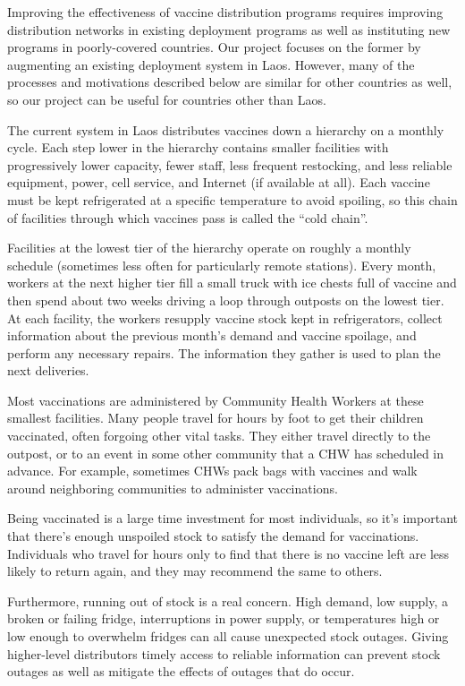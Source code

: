 \documentclass{acm_proc_article-sp}
\begin{document}
Improving the effectiveness of vaccine distribution programs requires improving distribution networks in existing deployment programs as well as instituting new programs in poorly-covered countries. Our project focuses on the former by augmenting an existing deployment system in Laos. However, many of the processes and motivations described below are similar for other countries as well, so our project can be useful for countries other than Laos.

The current system in Laos distributes vaccines down a hierarchy on a monthly cycle. Each step lower in the hierarchy contains smaller facilities with progressively lower capacity, fewer staff, less frequent restocking, and less reliable equipment, power, cell service, and Internet (if available at all). Each vaccine must be kept refrigerated at a specific temperature to avoid spoiling, so this chain of facilities through which vaccines pass is called the ``cold chain''.

Facilities at the lowest tier of the hierarchy operate on roughly a monthly schedule (sometimes less often for particularly remote stations). Every month, workers at the next higher tier fill a small truck with ice chests full of vaccine and then spend about two weeks driving a loop through outposts on the lowest tier. At each facility, the workers resupply vaccine stock kept in refrigerators, collect information about the previous month's demand and vaccine spoilage, and perform any necessary repairs. The information they gather is used to plan the next deliveries. 

Most vaccinations are administered by Community Health Workers at these smallest facilities. Many people travel for hours by foot to get their children vaccinated, often forgoing other vital tasks. They either travel directly to the outpost, or to an event in some other community that a CHW has scheduled in advance. For example, sometimes CHWs pack bags with vaccines and walk around neighboring communities to administer vaccinations.

Being vaccinated is a large time investment for most individuals, so it's important that there's enough unspoiled stock to satisfy the demand for vaccinations. Individuals who travel for hours only to find that there is no vaccine left are less likely to return again, and they may recommend the same to others. 

Furthermore, running out of stock is a real concern. High demand, low supply, a broken or failing fridge, interruptions in power supply, or temperatures high or low enough to overwhelm fridges can all cause unexpected stock outages. Giving higher-level distributors timely access to reliable information can prevent stock outages as well as mitigate the effects of outages that do occur.
\end{document}
